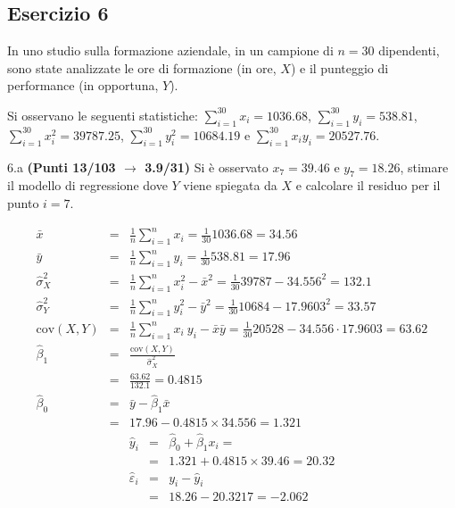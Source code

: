 \documentclass[
  11pt,
]{book}
\theoremstyle{mytheoremstyle}
\theoremstyle{mydefstyle}
\newenvironment{sol}
  {
  \begin{tcolorbox}[enhanced,breakable,arc=0.1mm,boxrule=1pt,colback=white,colframe=iblue,
  title=\bf \fontfamily{lmss}\selectfont \hspace{.5 cm} Soluzione,drop fuzzy shadow]

}{
\end{tcolorbox}
  }
\begin{document}
\subsection{Esercizio 6}\label{esercizio-6-33}

In uno studio sulla formazione aziendale, in un campione di \(n=30\) dipendenti, sono state analizzate le ore di formazione (in ore, \(X\)) e il punteggio di performance (in opportuna, \(Y\)).

Si osservano le seguenti statistiche:
\(\sum_{i=1}^{30}x_i=1036.68\), \(\sum_{i=1}^{30}y_i=538.81\),
\(\sum_{i=1}^{30}x_i^2=39787.25\), \(\sum_{i=1}^{30}y_i^2=10684.19\) e \(\sum_{i=1}^{30}x_iy_i=20527.76\).

6.a \textbf{(Punti 13/103 \(\rightarrow\) 3.9/31)} Si è osservato \(x_7=39.46\) e \(y_7=18.26\), stimare il modello di regressione dove \(Y\) viene spiegata da \(X\) e calcolare il residuo per il punto \(i=7\).

\begin{sol}
\begin{eqnarray*}
           \bar x &=&\frac 1 n\sum_{i=1}^n x_i = \frac {1}{ 30 }  1036.68 =  34.56 \\
           \bar y &=&\frac 1 n\sum_{i=1}^n y_i = \frac {1}{ 30 }  538.81 =  17.96 \\
           \hat\sigma_X^2&=&\frac 1 n\sum_{i=1}^n x_i^2-\bar x^2=\frac {1}{ 30 }  39787  - 34.556 ^2= 132.1 \\
           \hat\sigma_Y^2&=&\frac 1 n\sum_{i=1}^n y_i^2-\bar y^2=\frac {1}{ 30 }  10684  - 17.9603 ^2= 33.57 \\
           \text{cov}(X,Y)&=&\frac 1 n\sum_{i=1}^n x_i~y_i-\bar x\bar y=\frac {1}{ 30 }  20528 - 34.556 \cdot 17.9603 = 63.62 \\
           \hat\beta_1 &=& \frac{\text{cov}(X,Y)}{\hat\sigma_X^2} \\
                    &=& \frac{ 63.62 }{ 132.1 }  =  0.4815 \\
           \hat\beta_0 &=& \bar y - \hat\beta_1 \bar x\\
                    &=&  17.96 - 0.4815 \times  34.556 = 1.321 
         \end{eqnarray*}\begin{eqnarray*}
\hat y_i &=&\hat\beta_0+\hat\beta_1 x_i=\\ 
&=& 1.321 + 0.4815 \times 39.46 = 20.32 \\ 
\hat \varepsilon_i &=& y_i-\hat y_i\\ 
&=& 18.26 - 20.3217 = -2.062  
\end{eqnarray*}

\end{sol}
\end{document}
